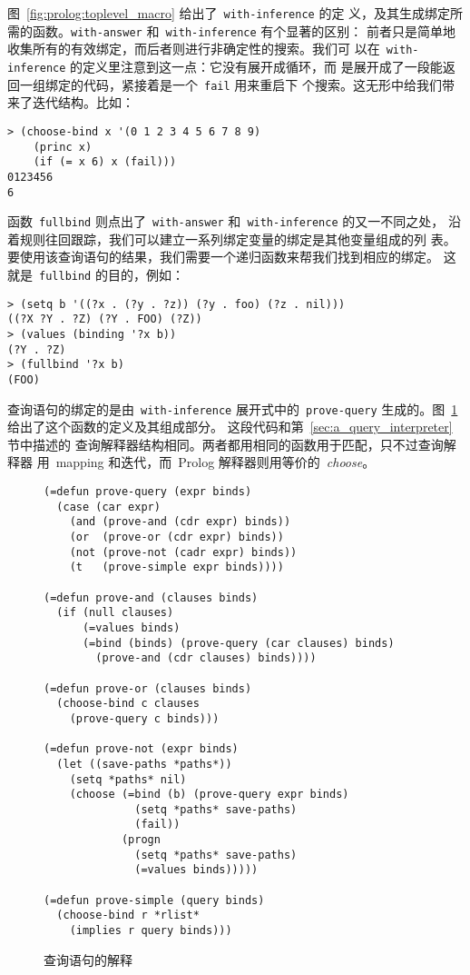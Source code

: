 图~\ref{fig:prolog:toplevel_macro} 给出了~\texttt{with-inference} 的定
义，及其生成绑定所需的函数。\texttt{with-answer} 和~\texttt{with-inference} 有个显著的区别：
前者只是简单地收集所有的有效绑定，而后者则进行非确定性的搜索。我们可
以在~\texttt{with-inference} 的定义里注意到这一点：它没有展开成循环，而
是展开成了一段能返回一组绑定的代码，紧接着是一个~\texttt{fail} 用来重启下
个搜索。这无形中给我们带来了迭代结构。比如：
\begin{lstlisting}
> (choose-bind x '(0 1 2 3 4 5 6 7 8 9)
    (princ x)
    (if (= x 6) x (fail)))
0123456
6
\end{lstlisting}

函数~\texttt{fullbind} 则点出了~\texttt{with-answer} 和~\texttt{with-inference} 的又一不同之处，
沿着规则往回跟踪，我们可以建立一系列绑定\pozhehao{}变量的绑定是其他变量组成的列
表。要使用该查询语句的结果，我们需要一个递归函数来帮我们找到相应的绑定。
这就是~\texttt{fullbind} 的目的，例如：
\begin{lstlisting}
> (setq b '((?x . (?y . ?z)) (?y . foo) (?z . nil)))
((?X ?Y . ?Z) (?Y . FOO) (?Z))
> (values (binding '?x b))
(?Y . ?Z)
> (fullbind '?x b)
(FOO)
\end{lstlisting}

查询语句的绑定的是由~\texttt{with-inference} 展开式中的~\texttt{prove-query}
生成的。图~\ref{fig:interpretation_of_queries} 给出了这个函数的定义及其组成部分。
这段代码和第~\ref{sec:a_query_interpreter} 节中描述的
查询解释器结构相同。两者都用相同的函数用于匹配，只不过查询解释器
用~mapping 和迭代，而~Prolog 解释器则用等价的~\emph{choose}。

\begin{figure}
\begin{lstlisting}
(=defun prove-query (expr binds)
  (case (car expr)
    (and (prove-and (cdr expr) binds))
    (or  (prove-or (cdr expr) binds))
    (not (prove-not (cadr expr) binds))
    (t   (prove-simple expr binds))))

(=defun prove-and (clauses binds)
  (if (null clauses)
      (=values binds)
      (=bind (binds) (prove-query (car clauses) binds)
        (prove-and (cdr clauses) binds))))

(=defun prove-or (clauses binds)
  (choose-bind c clauses
    (prove-query c binds)))

(=defun prove-not (expr binds)
  (let ((save-paths *paths*))
    (setq *paths* nil)
    (choose (=bind (b) (prove-query expr binds)
              (setq *paths* save-paths)
              (fail))
            (progn
              (setq *paths* save-paths)
              (=values binds)))))

(=defun prove-simple (query binds)
  (choose-bind r *rlist*
    (implies r query binds)))

\end{lstlisting}
  \caption{查询语句的解释}
  \label{fig:interpretation_of_queries}
\end{figure}


